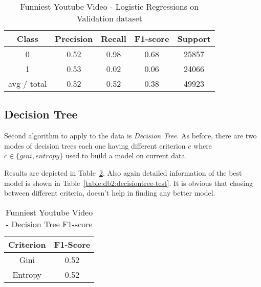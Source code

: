 \begin{table}[p]
\begin{center}
\begin{tabular}{|c|c|c|c|c|}
\hline Class & Precision & Recall & F1-score & Support \\

\hline 0 & 0.52 & 0.98 & 0.68 & 25857\\
\hline 1 & 0.53 & 0.02 & 0.06 & 24066\\
\hline avg / total & 0.52 & 0.52 & 0.38 & 49923\\
\hline
\end{tabular}

\caption{Funniest Youtube Video - Logistic Regressions on Validation dataset}
\label{table:ds3:logisticregression-test}
\end{center}
\end{table}

\subsection{Decision Tree}

Second algorithm to apply to the data is {\it Decision Tree}. As before, there
are two modes of decision trees each one having different criterion $c$ where
$ c \in\{ gini,entropy\}$ used to build a model on current data.

Results are depicted in Table~\ref{table:ds3:decisiontree}. Also again detailed
information of the best model is shown in
Table~\ref{table:db2:decisiontree-test}. It is obvious that chosing between
different criteria, doesn't help in finding any better model.

\begin{table}[p]
\begin{center}
\begin{tabular}{|c|c|}
\hline Criterion & F1-Score \\

\hline Gini & 0.52 \\

\hline Entropy & 0.52 \\

\hline
\end{tabular}

\caption{Funniest Youtube Video - Decision Tree F1-score}
\label{table:ds3:decisiontree}
\end{center}
\end{table}


